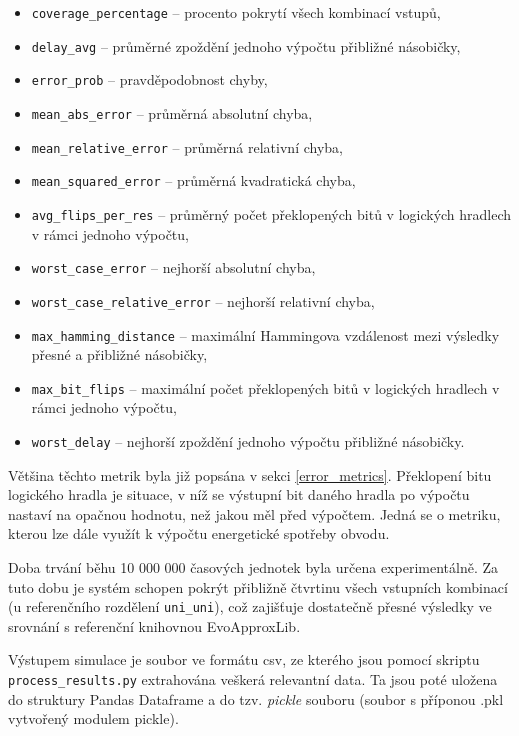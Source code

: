 \begin{itemize}
    \item \texttt{coverage\_percentage} -- procento pokrytí všech kombinací vstupů,
    \item \texttt{delay\_avg} -- průměrné zpoždění jednoho výpočtu přibližné násobičky,
    \item \texttt{error\_prob} -- pravděpodobnost chyby,
    \item \texttt{mean\_abs\_error} -- průměrná absolutní chyba,
    \item \texttt{mean\_relative\_error} -- průměrná relativní chyba,
    \item \texttt{mean\_squared\_error} -- průměrná kvadratická chyba,
    \item \texttt{avg\_flips\_per\_res} -- průměrný počet překlopených bitů v logických hradlech v rámci jednoho výpočtu,
    \item \texttt{worst\_case\_error} -- nejhorší absolutní chyba,
    \item \texttt{worst\_case\_relative\_error} -- nejhorší relativní chyba,
    \item \texttt{max\_hamming\_distance} -- maximální Hammingova vzdálenost mezi výsledky přesné a přibližné násobičky,
    \item \texttt{max\_bit\_flips} -- maximální počet překlopených bitů v logických hradlech v rámci jednoho výpočtu,
    \item \texttt{worst\_delay} -- nejhorší zpoždění jednoho výpočtu přibližné násobičky.
\end{itemize}

Většina těchto metrik byla již popsána v sekci \ref{error_metrics}. Překlopení bitu logického hradla je situace, v níž se výstupní bit daného hradla po výpočtu nastaví na opačnou hodnotu, než jakou měl před výpočtem. Jedná se o metriku, kterou lze dále využít k výpočtu energetické spotřeby obvodu.

Doba trvání běhu 10 000 000 časových jednotek byla určena experimentálně. Za tuto dobu je systém schopen pokrýt přibližně čtvrtinu všech vstupních kombinací (u referenčního rozdělení \texttt{uni\_uni}), což zajišťuje dostatečně přesné výsledky ve srovnání s referenční knihovnou EvoApproxLib.

Výstupem simulace je soubor ve formátu csv, ze kterého jsou pomocí skriptu \\\texttt{process\_results.py} extrahována veškerá relevantní data. Ta jsou poté uložena do struktury Pandas Dataframe a do tzv. \textit{pickle} souboru (soubor s příponou .pkl vytvořený modulem pickle).

